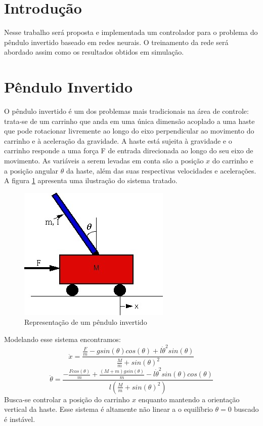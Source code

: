 \documentclass{article}
\begin{document}


\onehalfspacing
\section{Introdução}
Nesse trabalho será proposta e implementada um controlador para o problema do pêndulo invertido baseado em redes neurais. O treinamento da rede será abordado assim como os resultados obtidos em simulação.

\section{Pêndulo Invertido}
O pêndulo invertido é um dos problemas mais tradicionais na área de controle: trata-se de um carrinho que anda em uma única dimensão acoplado a uma haste que pode rotacionar livremente ao longo do eixo perpendicular ao movimento do carrinho e à aceleração da gravidade.
A haste está sujeita à gravidade e o carrinho responde a uma força F de entrada direcionada ao longo do seu eixo de movimento. As variáveis a serem levadas em conta são a posição $x$ do carrinho e a posição angular $\theta$ da haste, além das suas respectivas velocidades e acelerações. A figura \ref{fig:invpen} apresenta uma ilustração do sistema tratado.

\begin{figure}[H]
	\centering
	\includegraphics[width=0.5\linewidth]{invpen}
	\caption{Representação de um pêndulo invertido}
	\label{fig:invpen}
\end{figure}
Modelando esse sistema encontramos:
\begin{equation}
	\ddot{x} = \frac{\frac{F}{m} - gsin(\theta)cos(\theta) + l\dot{\theta}^2sin(\theta)}{\frac{M}{m} + sin(\theta)^2}
\end{equation}
\begin{equation}
	\ddot{\theta} = \frac{-\frac{Fcos(\theta)}{m} + \frac{(M+m)gsin(\theta)}{m} - l\dot{\theta}^2sin(\theta)cos(\theta)}{l(\frac{M}{m} + sin(\theta)^2)}
\end{equation}
Busca-se controlar a posição do carrinho $x$ enquanto mantendo a orientação vertical da haste. Esse sistema é altamente não linear a o equilíbrio $\theta = 0$ buscado é instável.
\end{document}
